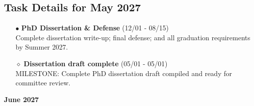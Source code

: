\documentclass[landscape,a4paper]{article}
\begin{document}
\vspace{0.5cm}
\subsection{Task Details for May 2027}
\begin{itemize}[leftmargin=1cm]
    \item[\textcolor{other}{$\bullet$}] \textbf{PhD Dissertation \& Defense} (12/01 - 08/15)\\ Complete dissertation write-up; final defense; and all graduation requirements by Summer 2027.
    \item[\textcolor{other}{$\diamond$}] \textbf{Dissertation draft complete} (05/01 - 05/01)\\ MILESTONE: Complete PhD dissertation draft compiled and ready for committee review.
\end{itemize}

\newpage
\pagestyle{empty}

\begin{center}
{\large\textbf{June 2027}}
\end{center}

\vspace{0.5cm}
\end{document}
